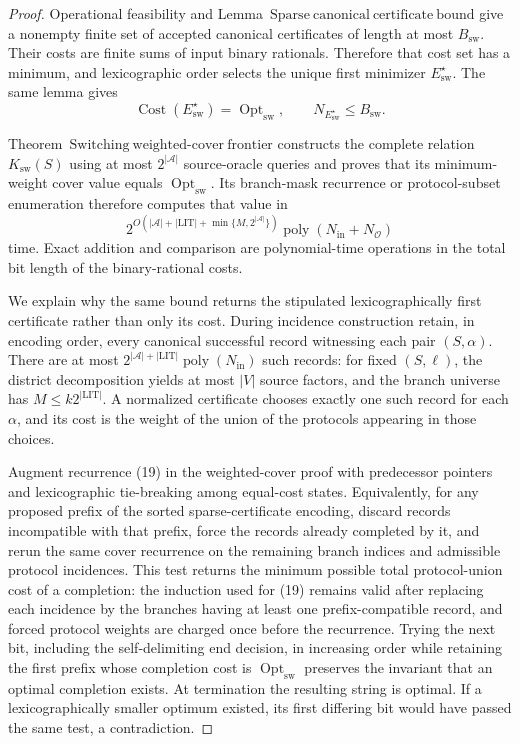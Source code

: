 \documentclass{article}
\begin{document}
\begin{proof}
Operational feasibility and Lemma~\(\mathrm{Sparse\ canonical\ certificate\ bound}\) give a nonempty finite set of accepted canonical certificates of length at most \(B_{\mathrm{sw}}\).  Their costs are finite sums of input binary rationals.  Therefore that cost set has a minimum, and lexicographic order selects the unique first minimizer \(E_{\mathrm{sw}}^{\star}\).  The same lemma gives
\[
 \operatorname{Cost}(E_{\mathrm{sw}}^{\star})=\operatorname{Opt}_{\mathrm{sw}},
 \qquad
 N_{E_{\mathrm{sw}}^{\star}}\leq B_{\mathrm{sw}}.
 \tag{24}
\]

Theorem~\(\mathrm{Switching\ weighted\mbox{-}cover\ frontier}\) constructs the complete relation \(K_{\mathrm{sw}}(S)\) using at most \(2^{|\mathcal A|}\) source-oracle queries and proves that its minimum-weight cover value equals \(\operatorname{Opt}_{\mathrm{sw}}\).  Its branch-mask recurrence or protocol-subset enumeration therefore computes that value in
\[
 2^{O(|\mathcal A|+|\mathrm{LIT}|+\min\{M,2^{|\mathcal A|}\})}
 \operatorname{poly}(N_{\mathrm{in}}+N_{\mathcal O})
 \tag{25}
\]
time.  Exact addition and comparison are polynomial-time operations in the total bit length of the binary-rational costs.

We explain why the same bound returns the stipulated lexicographically first certificate rather than only its cost.  During incidence construction retain, in encoding order, every canonical successful record witnessing each pair \((S,\alpha)\).  There are at most \(2^{|\mathcal A|+|\mathrm{LIT}|}\operatorname{poly}(N_{\mathrm{in}})\) such records: for fixed \((S,\ell)\), the district decomposition yields at most \(|V|\) source factors, and the branch universe has \(M\leq k2^{|\mathrm{LIT}|}\).  A normalized certificate chooses exactly one such record for each \(\alpha\), and its cost is the weight of the union of the protocols appearing in those choices.

Augment recurrence (19) in the weighted-cover proof with predecessor pointers and lexicographic tie-breaking among equal-cost states.  Equivalently, for any proposed prefix of the sorted sparse-certificate encoding, discard records incompatible with that prefix, force the records already completed by it, and rerun the same cover recurrence on the remaining branch indices and admissible protocol incidences.  This test returns the minimum possible total protocol-union cost of a completion: the induction used for (19) remains valid after replacing each incidence by the branches having at least one prefix-compatible record, and forced protocol weights are charged once before the recurrence.  Trying the next bit, including the self-delimiting end decision, in increasing order while retaining the first prefix whose completion cost is \(\operatorname{Opt}_{\mathrm{sw}}\) preserves the invariant that an optimal completion exists.  At termination the resulting string is optimal.  If a lexicographically smaller optimum existed, its first differing bit would have passed the same test, a contradiction.


\end{proof}
\end{document}
